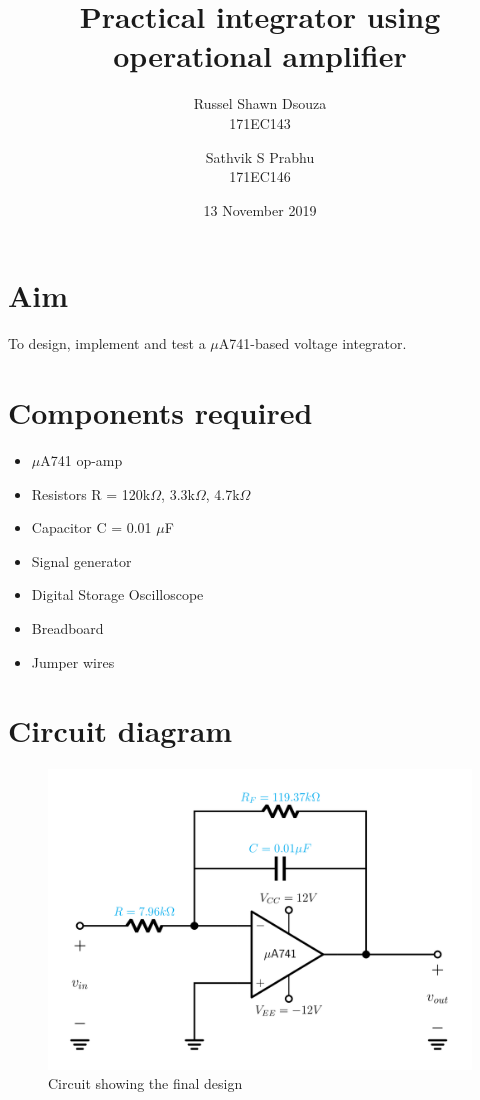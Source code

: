 \documentclass[12pt, titlepage]{article}
\title{\textbf{Practical integrator using operational amplifier}}
\author{
  Russel Shawn Dsouza\\
  171EC143
  \and
  Sathvik S Prabhu\\
  171EC146
}
\date{13 November 2019}
\theoremstyle{definition}
\begin{document}
  \maketitle
  \thispagestyle{empty}

  \newpage
  \tableofcontents
  \thispagestyle{empty}

  \newpage
  \setcounter{page}{1}
  \section{Aim}
    To design, implement and test a $\mu$A741-based voltage integrator.


  \section*{Components required}
    \begin{itemize}
      \item $\mu$A741 op-amp
      \item Resistors R = 120k$\Omega$, 3.3k$\Omega$, 4.7k$\Omega$
      \item Capacitor C = 0.01 $\mu$F
      \item Signal generator
      \item Digital Storage Oscilloscope
      \item Breadboard
      \item Jumper wires
    \end{itemize}


  \newpage
  \section{Circuit diagram}
    \begin{figure}[h]
      \centering
      \includegraphics[scale=0.25]{images/designed_practical_integrator.png}
      \caption{Circuit showing the final design}
      \label{fig:designed_practical_integrator}
    \end{figure}
\end{document}
